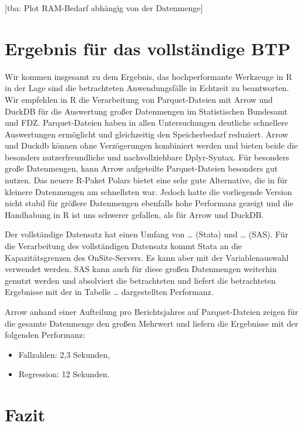\documentclass[
  german,
  10pt,
  twoside]{article}
\providecommand{\tightlist}{%
  \setlength{\itemsep}{0pt}\setlength{\parskip}{0pt}}
\begin{document}
{[}tba: Plot RAM-Bedarf abhängig von der Datenmenge{]}

\setcounter{subsection}{4}

\section{Ergebnis für das vollständige BTP}\label{sec-ergebnis}

Wir kommen insgesamt zu dem Ergebnis, das hochperformante Werkzeuge in R
in der Lage sind die betrachteten Anwendungsfälle in Echtzeit zu
beantworten. Wir empfehlen in R die Verarbeitung von Parquet-Dateien mit
Arrow und DuckDB für die Auswertung großer Datenmengen im Statistischen
Bundesamt und FDZ. Parquet-Dateien haben in allen Untersuchungen
deutliche schnellere Auswertungen ermöglicht und gleichzeitig den
Speicherbedarf reduziert. Arrow und Duckdb können ohne Verzögerungen
kombiniert werden und bieten beide die besonders nutzerfreundliche und
nachvollziehbare Dplyr-Syntax. Für besonders große Datenmengen, kann
Arrow aufgeteilte Parquet-Dateien besonders gut nutzen. Das neuere
R-Paket Polars bietet eine sehr gute Alternative, die in für kleinere
Datenmengen am schnellsten war. Jedoch hatte die vorliegende Version
nicht stabil für größere Datenmengen ebenfalls hohe Performanz gezeigt
und die Handhabung in R ist uns schwerer gefallen, als für Arrow und
DuckDB.

Der vollständige Datensatz hat einen Umfang von \ldots{} (Stata) und
\ldots{} (SAS). Für die Verarbeitung des vollständigen Datensatz kommt
Stata an die Kapazitätsgrenzen des OnSite-Servers. Es kann aber mit der
Variablenauswahl verwendet werden. SAS kann auch für diese großen
Datenmengen weiterhin genutzt werden und absolviert die betrachteten und
liefert die betrachteten Ergebnisse mit der in Tabelle \ldots{}
dargestellten Performanz.

Arrow anhand einer Aufteilung pro Berichtsjahres auf Parquet-Dateien
zeigen für die gesamte Datenmenge den großen Mehrwert und liefern die
Ergebnisse mit der folgenden Performanz:

\begin{itemize}
\tightlist
\item
  Fallzahlen: 2,3 Sekunden,
\item
  Regression: 12 Sekunden.
\end{itemize}

\setcounter{subsection}{5}

\section{Fazit}\label{sec-ausblick}
\end{document}
